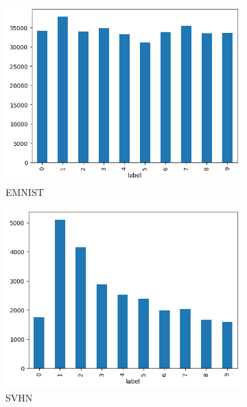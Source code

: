 \begin{figure}[tb]
	\centering
	\begin{subfigure}{0.3\textwidth}
		\centering
		\includegraphics[width=\textwidth]{Bilder/emnist_label_distribution.png}
		\caption{EMNIST}
	\end{subfigure}
	\begin{subfigure}{0.3\textwidth}
		\centering
		\includegraphics[width=\textwidth]{Bilder/svhn_label_distribution.png}
		\caption{SVHN}
	\end{subfigure}
	\begin{subfigure}{0.3\textwidth}
		\centering

\end{subfigure}
\end{figure}
